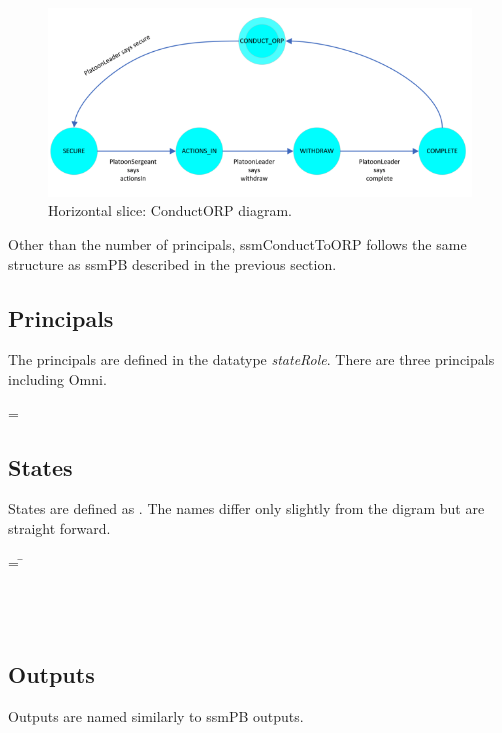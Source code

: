 \documentclass[../../main/main.tex]{subfiles}
\begin{document}
\begin{figure}[h!]
\centering
\includegraphics[width=\textwidth]{../figures/ssmConductORPDiagram}
\caption{\label{ssmConductORPDiagram2} Horizontal slice: ConductORP diagram.}
\end{figure}


Other than the number of principals, ssmConductToORP follows the same structure as ssmPB described in the previous section.  

\subsection{Principals}
The principals are defined in the datatype \textit{stateRole}.  There are three principals including Omni.

 =  \HOLTokenBar{}  \HOLTokenBar{} 

\subsection{States}
States are defined as .  The names differ only slightly from the digram but are straight forward.  
\begin{tabbing}
 = \= \\
					\>\HOLTokenBar{}  \\
					\>\HOLTokenBar{}  \\
					\>\HOLTokenBar{} \\
        					\>\HOLTokenBar{} 
\end{tabbing}

\subsection{Outputs}
Outputs are named similarly to ssmPB outputs.
\end{document}
